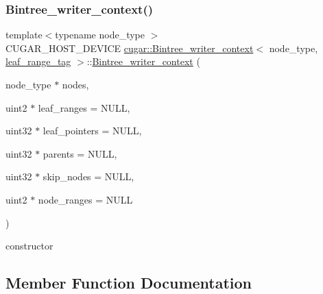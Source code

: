 \subsubsection{\texorpdfstring{Bintree\+\_\+writer\+\_\+context()}{Bintree\_writer\_context()}\hspace{0.1cm}{\footnotesize\ttfamily [2/2]}}
{\footnotesize\ttfamily template$<$typename node\+\_\+type $>$ \\
C\+U\+G\+A\+R\+\_\+\+H\+O\+S\+T\+\_\+\+D\+E\+V\+I\+CE \hyperlink{structcugar_1_1_bintree__writer__context}{cugar\+::\+Bintree\+\_\+writer\+\_\+context}$<$ node\+\_\+type, \hyperlink{structcugar_1_1leaf__range__tag}{leaf\+\_\+range\+\_\+tag} $>$\+::\hyperlink{structcugar_1_1_bintree__writer__context}{Bintree\+\_\+writer\+\_\+context} (\begin{DoxyParamCaption}\item[{node\+\_\+type $\ast$}]{nodes,  }\item[{uint2 $\ast$}]{leaf\+\_\+ranges = {\ttfamily NULL},  }\item[{uint32 $\ast$}]{leaf\+\_\+pointers = {\ttfamily NULL},  }\item[{uint32 $\ast$}]{parents = {\ttfamily NULL},  }\item[{uint32 $\ast$}]{skip\+\_\+nodes = {\ttfamily NULL},  }\item[{uint2 $\ast$}]{node\+\_\+ranges = {\ttfamily NULL} }\end{DoxyParamCaption})\hspace{0.3cm}{\ttfamily [inline]}}

constructor 

\subsection{Member Function Documentation}
\mbox{\label{structcugar_1_1_bintree__writer__context_3_01node__type_00_01leaf__range__tag_01_4_a344908507094f704f0de59b9050ca302}} 
